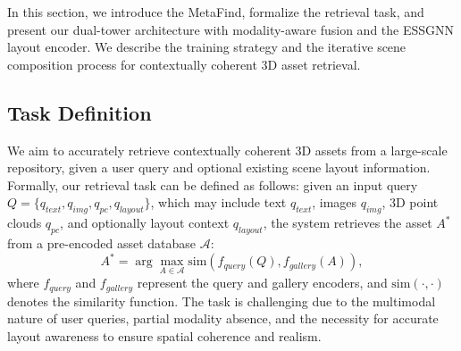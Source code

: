 \label{sec:methdology}
In this section, we introduce the MetaFind, formalize the retrieval task, and present our dual-tower architecture with modality-aware fusion and the ESSGNN layout encoder. We describe the training strategy and the iterative scene composition process for contextually coherent 3D asset retrieval.
\subsection{Task Definition}
We aim to accurately retrieve contextually coherent 3D assets from a large-scale repository, given a user query and optional existing scene layout information. Formally, our retrieval task can be defined as follows: given an input query \( Q = \{q_{text}, q_{img}, q_{pc}, q_{layout}\} \), which may include text \(q_{text}\), images \(q_{img}\), 3D point clouds \(q_{pc}\), and optionally layout context \(q_{layout}\), the system retrieves the asset \(A^*\) from a pre-encoded asset database \(\mathcal{A}\):
\begin{equation}
    A^* = \arg\max_{A \in \mathcal{A}} \text{sim}(f_{query}(Q), f_{gallery}(A)),
\end{equation}
where $f_{query}$ and $f_{gallery}$ represent the query and gallery encoders, and $\text{sim}(\cdot, \cdot)$ denotes the similarity function. The task is challenging due to the multimodal nature of user queries, partial modality absence, and the necessity for accurate layout awareness to ensure spatial coherence and realism.
